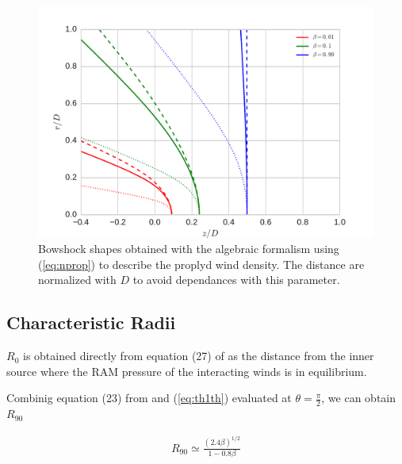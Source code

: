 \begin{figure}
\includegraphics[width=\linewidth]{r-beta}
\caption{Bowshock shapes obtained with the \citep{Canto:1996} algebraic formalism using (\ref{eq:nprop}) to describe the proplyd wind density. The distance are normalized with  $D$
to avoid dependances with this parameter. }
\end{figure}

\subsection{Characteristic Radii}

$R_0$ is obtained directly from equation (27) of \citep{Canto:1996} as the distance from the inner source where the RAM pressure of the interacting winds is in equilibrium.

Combinig equation (23) from \citep{Canto:1996} and  (\ref{eq:th1th}) evaluated at $\theta=\frac{\pi}{2}$, we can obtain $R_{90}$ 

\begin{align}
R_{90} \simeq \frac{\left(2.4\beta\right)^{1/2}}{1-0.8\beta}
\label{eq:r90}
\end{align}


